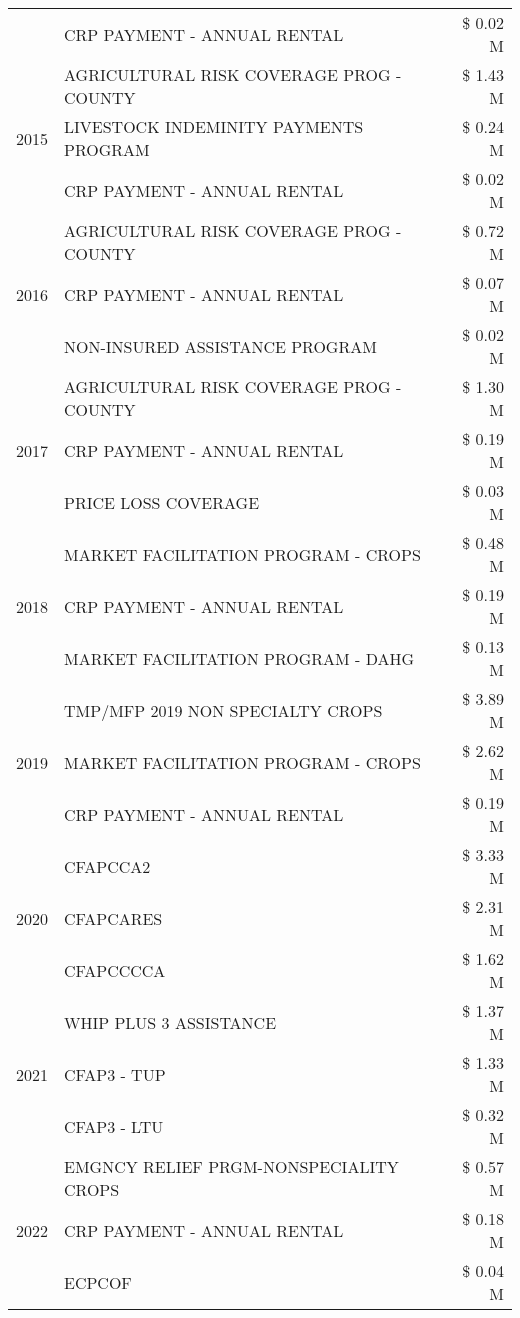 \begin{tabular}{llr}
 & CRP PAYMENT - ANNUAL RENTAL & \$ 0.02 M \\
\cline{1-3}
\multirow[t]{3}{*}{2015} & AGRICULTURAL RISK COVERAGE PROG - COUNTY & \$ 1.43 M \\
 & LIVESTOCK INDEMINITY PAYMENTS PROGRAM & \$ 0.24 M \\
 & CRP PAYMENT - ANNUAL RENTAL & \$ 0.02 M \\
\cline{1-3}
\multirow[t]{3}{*}{2016} & AGRICULTURAL RISK COVERAGE PROG - COUNTY & \$ 0.72 M \\
 & CRP PAYMENT - ANNUAL RENTAL & \$ 0.07 M \\
 & NON-INSURED ASSISTANCE PROGRAM & \$ 0.02 M \\
\cline{1-3}
\multirow[t]{3}{*}{2017} & AGRICULTURAL RISK COVERAGE PROG - COUNTY & \$ 1.30 M \\
 & CRP PAYMENT - ANNUAL RENTAL & \$ 0.19 M \\
 & PRICE LOSS COVERAGE & \$ 0.03 M \\
\cline{1-3}
\multirow[t]{3}{*}{2018} & MARKET FACILITATION PROGRAM - CROPS & \$ 0.48 M \\
 & CRP PAYMENT - ANNUAL RENTAL & \$ 0.19 M \\
 & MARKET FACILITATION PROGRAM - DAHG & \$ 0.13 M \\
\cline{1-3}
\multirow[t]{3}{*}{2019} & TMP/MFP 2019 NON SPECIALTY CROPS & \$ 3.89 M \\
 & MARKET FACILITATION PROGRAM - CROPS & \$ 2.62 M \\
 & CRP PAYMENT - ANNUAL RENTAL & \$ 0.19 M \\
\cline{1-3}
\multirow[t]{3}{*}{2020} & CFAPCCA2 & \$ 3.33 M \\
 & CFAPCARES & \$ 2.31 M \\
 & CFAPCCCCA & \$ 1.62 M \\
\cline{1-3}
\multirow[t]{3}{*}{2021} & WHIP PLUS 3 ASSISTANCE & \$ 1.37 M \\
 & CFAP3 - TUP & \$ 1.33 M \\
 & CFAP3 - LTU & \$ 0.32 M \\
\cline{1-3}
\multirow[t]{3}{*}{2022} & EMGNCY RELIEF PRGM-NONSPECIALITY CROPS & \$ 0.57 M \\
 & CRP PAYMENT - ANNUAL RENTAL & \$ 0.18 M \\
 & ECPCOF & \$ 0.04 M \\
\cline{1-3}
\bottomrule
\end{tabular}
